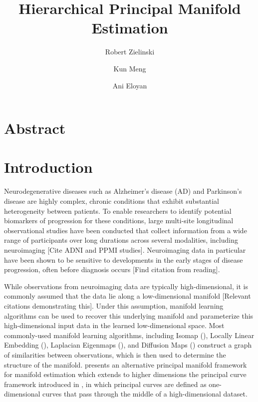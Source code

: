 \documentclass[11pt,reqno]{article}
\theoremstyle{definition}
\begin{document}
\title{Hierarchical Principal Manifold Estimation}
\author[1]{Robert Zielinski}
\author[2]{Kun Meng}
\author[1]{Ani Eloyan}



\maketitle

\doublespacing

\section*{Abstract}

\section{Introduction}

Neurodegenerative diseases such as Alzheimer's disease (AD) and Parkinson's disease are highly complex, chronic conditions that exhibit substantial heterogeneity between patients. To enable researchers to identify potential biomarkers of progression for these conditions, large multi-site longitudinal observational studies have been conducted that collect information from a wide range of participants over long durations across several modalities, including neuroimaging [Cite ADNI and PPMI studies]. Neuroimaging data in particular have been shown to be sensitive to developments in the early stages of disease progression, often before diagnosis occurs [Find citation from reading].

While observations from neuroimaging data are typically high-dimensional, it is commonly assumed that the data lie along a low-dimensional manifold [Relevant citations demonstrating this]. Under this assumption, manifold learning algorithms can be used to recover this underlying manifold and parameterize this high-dimensional input data in the learned low-dimensional space. Most commonly-used manifold learning algorithms, including Isomap (\cite{tenenbaumGlobalGeometricFramework2000}), Locally Linear Embedding (\cite{roweisNonlinearDimensionalityReduction2000}), Laplacian Eigenmaps (\cite{belkinLaplacianEigenmapsDimensionality2003}), and Diffusion Maps (\cite{coifmanDiffusionMaps2006}) construct a graph of similarities between observations, which is then used to determine the structure of the manifold. \cite{mengPrincipalManifoldEstimation2021} presents an alternative principal manifold framework for manifold estimation which extends to higher dimensions the principal curve framework introduced in \cite{hastiePrincipalCurves1989}, in which principal curves are defined as one-dimensional curves that pass through the middle of a high-dimensional dataset. 
\end{document}
